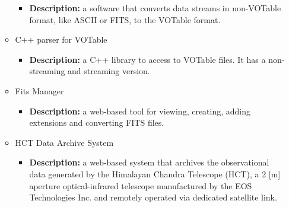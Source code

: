 \begin{itemize}
\begin{itemize}
\begin{itemize}
\item \textbf{Description:} a software that converts data streams in non-VOTable
format, like ASCII or FITS, to the VOTable format.
\end{itemize}
\item C++ parser for VOTable
\begin{itemize}
\item \textbf{Description:} a C++ library to access to VOTable files. It has a
non-streaming and streaming version.
\end{itemize}
\item Fits Manager
\begin{itemize}
\item \textbf{Description:} a web-based tool for viewing, creating, adding
extensions and converting FITS files.
\end{itemize}
\item HCT Data Archive System
\begin{itemize}
\item \textbf{Description:} a web-based system that archives the observational
data generated by the Himalayan Chandra Telescope (HCT), a 2 [m] aperture
optical-infrared telescope manufactured by the EOS Technologies Inc. and
remotely operated via dedicated satellite link.
\end{itemize}
\end{itemize}
\end{itemize}
